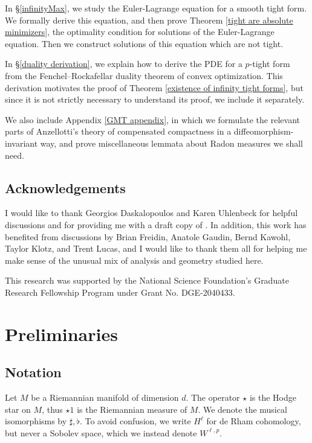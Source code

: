 \documentclass[reqno,11pt]{amsart}
\theoremstyle{definition}
\numberwithin{equation}{section}
\begin{document}
In \S\ref{infinityMax}, we study the Euler-Lagrange equation for a smooth tight form.
We formally derive this equation, and then prove Theorem \ref{tight are absolute minimizers}, the optimality condition for solutions of the Euler-Lagrange equation.
Then we construct solutions of this equation which are not tight.

In \S\ref{duality derivation}, we explain how to derive the PDE for a $p$-tight form from the Fenchel--Rockafellar duality theorem of convex optimization.
This derivation motivates the proof of Theorem \ref{existence of infinity tight forms}, but since it is not strictly necessary to understand its proof, we include it separately.

We also include Appendix \ref{GMT appendix}, in which we formulate the relevant parts of Anzellotti's theory of compensated compactness in a diffeomorphism-invariant way, and prove miscellaneous lemmata about Radon measures we shall need.


\subsection{Acknowledgements}
I would like to thank Georgios Daskalopoulos and Karen Uhlenbeck for helpful discussions and for providing me with a draft copy of \cite{daskalopoulos2023}.
In addition, this work has benefited from discussions by Brian Freidin, Anatole Gaudin, Bernd Kawohl, Taylor Klotz, and Trent Lucas, and I would like to thank them all for helping me make sense of the unusual mix of analysis and geometry studied here.

This research was supported by the National Science Foundation's Graduate Research Fellowship Program under Grant No. DGE-2040433.

\section{Preliminaries}\label{prelims}
\subsection{Notation}
Let $M$ be a Riemannian manifold of dimension $d$.
The operator $\star$ is the Hodge star on $M$, thus $\star 1$ is the Riemannian measure of $M$.
We denote the musical isomorphisms by $\sharp, \flat$.
To avoid confusion, we write $H^\ell$ for de Rham cohomology, but never a Sobolev space, which we instead denote $W^{\ell, p}$.
\end{document}
